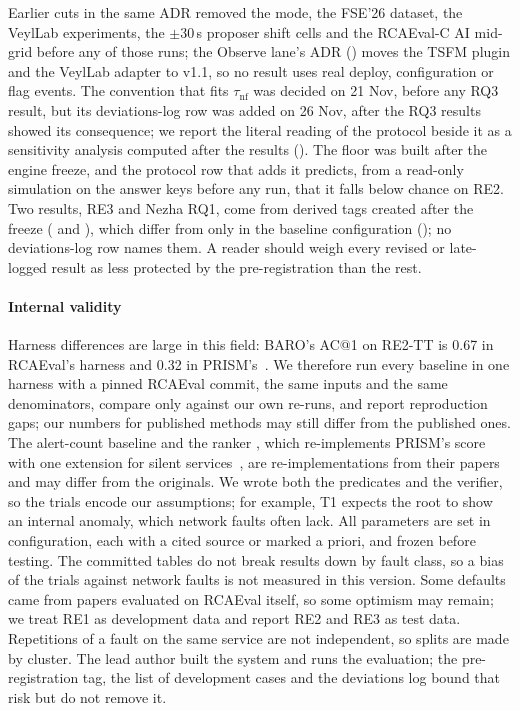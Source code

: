Earlier cuts in the same ADR removed the  mode, the FSE'26 dataset, the VeylLab experiments, the $\pm$30\,s proposer shift cells and the RCAEval-C AI mid-grid before any of those runs; the Observe lane's ADR (\allowbreak{}) moves the TSFM plugin and the VeylLab adapter to v1.1, so no result uses real deploy, configuration or flag events.
The convention that fits $\tau_{\mathrm{nf}}$ was decided on 21 Nov, before any RQ3 result, but its deviations-log row was added on 26 Nov, after the RQ3 results showed its consequence; we report the literal reading of the protocol beside it as a sensitivity analysis computed after the results ().
The  floor was built after the engine freeze, and the protocol row that adds it predicts, from a read-only simulation on the answer keys before any  run, that it falls below chance on RE2.
Two results, RE3 and Nezha RQ1, come from derived tags created after the freeze (\allowbreak{} and \allowbreak{}), which differ from  only in the baseline configuration (); no deviations-log row names them.
A reader should weigh every revised or late-logged result as less protected by the pre-registration than the rest.

\paragraph{Internal validity}
Harness differences are large in this field: BARO's AC@1 on RE2-TT is 0.67 in RCAEval's harness and 0.32 in PRISM's~\cite{rcaeval2024,prism2026}.
We therefore run every baseline in one harness with a pinned RCAEval commit, the same inputs and the same denominators, compare only against our own re-runs, and report reproduction gaps; our numbers for published methods may still differ from the published ones.
The alert-count baseline  and the ranker , which re-implements PRISM's score with one extension for silent services~\cite{prism2026}, are re-implementations from their papers and may differ from the originals.
We wrote both the predicates and the verifier, so the trials encode our assumptions; for example, T1 expects the root to show an internal anomaly, which network faults often lack.
All parameters are set in configuration, each with a cited source or marked a priori, and frozen before testing.
The committed tables do not break results down by fault class, so a bias of the trials against network faults is not measured in this version.
Some defaults came from papers evaluated on RCAEval itself, so some optimism may remain; we treat RE1 as development data and report RE2 and RE3 as test data.
Repetitions of a fault on the same service are not independent, so splits are made by cluster.
The lead author built the system and runs the evaluation; the pre-registration tag, the list of development cases and the deviations log bound that risk but do not remove it.

